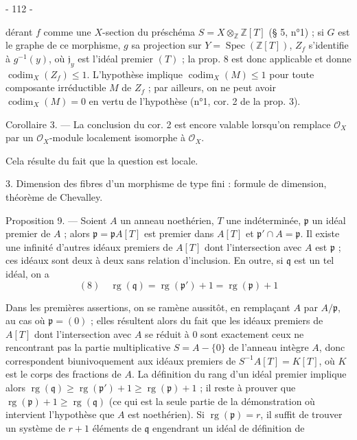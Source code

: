 \newpage


- 112 -

dérant $f$ comme une $X$-section du préschéma $S = X \otimes_{\mathbb{Z}} \mathbb{Z}[T]$ (§ 5, n°1) ; si $G$ est le graphe de ce morphisme, $g$ sa projection sur $Y = \operatorname{Spec}(\mathbb{Z}[T])$, $Z_f$ s'identifie à $g^{-1}(y)$, où $\mathfrak{j}_y$ est l'idéal premier $(T)$ ; la prop. 8 est donc applicable et donne $\operatorname{codim}_X(Z_f) \le 1$. L'hypothèse implique $\operatorname{codim}_X(M) \le 1$ pour toute composante irréductible $M$ de $Z_f$ ; par ailleurs, on ne peut avoir $\operatorname{codim}_X(M) = 0$ en vertu de l'hypothèse (n°1, cor. 2 de la prop. 3).

Corollaire 3. — La conclusion du cor. 2 est encore valable lorsqu'on remplace $\mathcal{O}_X$ par un $\mathcal{O}_X$-module localement isomorphe à $\mathcal{O}_X$.

Cela résulte du fait que la question est locale.

3. Dimension des fibres d'un morphisme de type fini : formule de dimension, théorème de Chevalley.

Proposition 9. — Soient $A$ un anneau noethérien, $T$ une indéterminée, $\mathfrak{p}$ un idéal premier de $A$ ; alors $\mathfrak{p} = \mathfrak{p}A[T]$ est premier dans $A[T]$ et $\mathfrak{p}' \cap A = \mathfrak{p}$. Il existe une infinité d'autres idéaux premiers de $A[T]$ dont l'intersection avec $A$ est $\mathfrak{p}$ ; ces idéaux sont deux à deux sans relation d'inclusion. En outre, si $\mathfrak{q}$ est un tel idéal, on a
$$(8) \quad \operatorname{rg}(\mathfrak{q}) = \operatorname{rg}(\mathfrak{p}') + 1 = \operatorname{rg}(\mathfrak{p}) + 1$$

Dans les premières assertions, on se ramène aussitôt, en remplaçant $A$ par $A/\mathfrak{p}$, au cas où $\mathfrak{p} = (0)$ ; elles résultent alors du fait que les idéaux premiers de $A[T]$ dont l'intersection avec $A$ se réduit à $0$ sont exactement ceux ne rencontrant pas la partie multiplicative $S = A - \{0\}$ de l'anneau intègre $A$, donc correspondent biunivoquement aux idéaux premiers de $S^{-1}A[T] = K[T]$, où $K$ est le corps des fractions de $A$. La définition du rang d'un idéal premier implique alors $\operatorname{rg}(\mathfrak{q}) \ge \operatorname{rg}(\mathfrak{p}') + 1 \ge \operatorname{rg}(\mathfrak{p}) + 1$ ; il reste à prouver que $\operatorname{rg}(\mathfrak{p}) + 1 \ge \operatorname{rg}(\mathfrak{q})$ (ce qui est la seule partie de la démonstration où intervient l'hypothèse que $A$ est noethérien). Si $\operatorname{rg}(\mathfrak{p}) = r$, il suffit de trouver un système de $r+1$ éléments de $\mathfrak{q}$ engendrant un idéal de définition de

